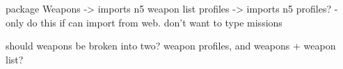 
package
    Weapons -> imports n5 weapon list
    profiles -> imports n5 profiles? - only do this if can import from web. don't want to type
    missions 

    should weapons be broken into two? weapon profiles, and weapons + weapon list?
    
    
    